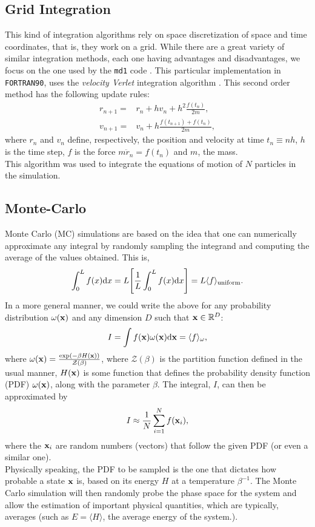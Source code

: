 \documentclass[%
aps,
pra,%
amsmath,amssymb,
preprint,%
reprint,%
notitlepage,
a4paper]{revtex4-1}
\newcommand{\md}{\texttt{md1} }
\newcommand{\average}[1]{\langle #1 \rangle}
\begin{document}
\subsection{Grid Integration}
This kind of integration algorithms rely on space discretization of space and time coordinates, that is, they work on a grid. While there are a great variety of similar integration methods, each one having advantages and disadvantages, we focus on the one used by the \md  code \cite{Ercolessi}. This particular implementation in \texttt{FORTRAN90}, uses the \textit{velocity Verlet} integration algorithm \cite{Swope1982}. This second order method has the following update rules:
\begin{align}
r_{n+1} =& r_n + h v_n + h^2\frac{f(t_n)}{2m},\\
v_{n+1} = & v_n + h\frac{f(t_{n+1} )+ f(t_n)}{2m},
\end{align}
where $r_n$ and $v_n$ define, respectively, the position and velocity at time $t_n\equiv nh$, $h$ is the time step, $f$ is the force $m\ddot{r}_n = f(t_n)$ and $m$, the mass.\\
This algorithm was used to integrate the equations of motion of $N$ particles in the simulation.
\subsection{Monte-Carlo}
Monte Carlo (MC) simulations are based on the idea that one can numerically approximate any integral by randomly sampling the integrand and computing the average of the values obtained. This is,
\begin{equation}
\int_0^Lf(x)\dd x = L \qty[\frac{1}{L}\int_0^Lf(x)\dd x] = L \average{f}_{\mathrm{uniform}}.
\end{equation}
In a more general manner, we could write the above for any probability distribution $\omega(\vb{x})$ and any dimension $D$ such that $\vb{x} \in \mathbb{R}^D$:
\begin{equation}
I = \int f(\vb{x})\omega(\vb{x})\dd\vb{x} = \average{f}_{\omega},
\end{equation}
where $\omega(\vb{x}) = \frac{\exp(-\beta H(\vb{x}))}{\mathcal{Z}(\beta)}$, where $\mathcal{Z}(\beta)$ is the partition function defined in the usual manner, $H(\vb{x})$ is some function that defines the probability density function (PDF) $\omega(\vb{x})$, along with the parameter $\beta$. The integral, $I$, can then be approximated by 
\begin{equation}
I \approx \frac{1}{N}\sum_{i=1}^{N}f(\vb{x}_i), 
\end{equation}
where the $\vb{x}_i$ are random numbers (vectors) that follow the given PDF (or even a similar one).\\
Physically speaking, the PDF to be sampled is the one that dictates how probable a state $\vb{x}$ is, based on its energy $H$ at a temperature $\beta^{-1}$. The Monte Carlo simulation will then randomly probe the phase space for the system and allow the estimation of important physical quantities, which are typically, averages (such as $E = \average{H}$, the average energy of the system.).
\end{document}
